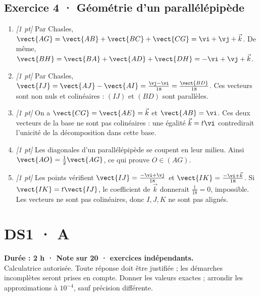 \subsection*{Exercice 4 · Géométrie d'un parallélépipède}\begin{enumerate}

\item \textit{[1 pt]} Par Chasles, $\vect{AG}=\vect{AB}+\vect{BC}+\vect{CG}=\vi +\vj +\vec k$. De même, $\vect{BH}=\vect{BA}+\vect{AD}+\vect{DH}=-\vi +\vj +\vec k$.

\item \textit{[1 pt]} Par Chasles, $\vect{IJ}=\vect{AJ}-\vect{AI}=\frac{\vj -\vi }{18}=\frac{\vect{BD}}{18}$. Ces vecteurs sont non nuls et colinéaires : $(IJ)$ et $(BD)$ sont parallèles.

\item \textit{[1 pt]} On a $\vect{CG}=\vect{AE}=\vec k$ et $\vect{AB}=\vi $. Ces deux vecteurs de la base ne sont pas colinéaires : une égalité $\vec k=t\vi $ contredirait l'unicité de la décomposition dans cette base.

\item \textit{[1 pt]} Les diagonales d'un parallélépipède se coupent en leur milieu. Ainsi $\vect{AO}=\frac12\vect{AG}$, ce qui prouve $O\in(AG)$.

\item \textit{[1 pt]} Les points vérifient $\vect{IJ}=\frac{-\vi +\vj }{18}$ et $\vect{IK}=\frac{-\vi +\vec k}{18}$. Si $\vect{IK}=t\vect{IJ}$, le coefficient de $\vec k$ donnerait $\frac{1}{18}=0$, impossible. Les vecteurs ne sont pas colinéaires, donc $I,J,K$ ne sont pas alignés.

\end{enumerate}

\fi

\ifmxteacher

\mxnewpage{}\label{sujet:1-3}

\section*{DS1 · A}


\textbf{Durée : 2 h · Note sur 20 ·  exercices indépendants.}\\Calculatrice autorisée. Toute réponse doit être justifiée ; les démarches incomplètes seront prises en compte. Donner les valeurs exactes ; arrondir les approximations à $10^{-4}$, sauf précision différente.

